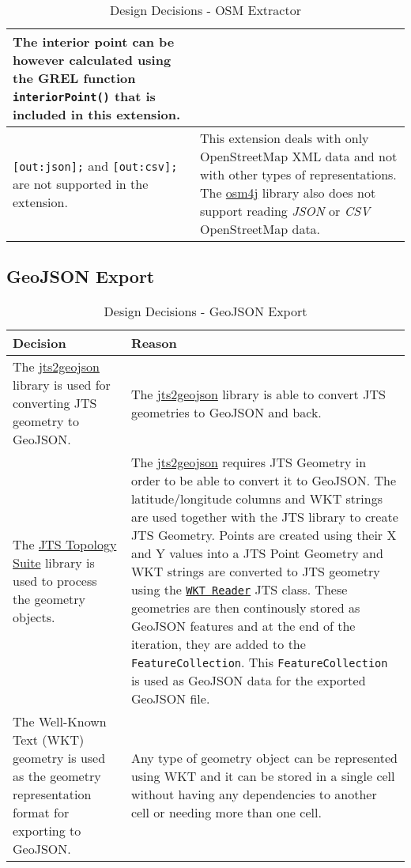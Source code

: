 \begin{table}[htbp]
\begin{tabularx}{\textwidth}{| X | X |}
        The interior point can be however calculated using the GREL function \texttt{interiorPoint()} that is included in this extension.\\ \hline
        \texttt{[out:json];} and \texttt{[out:csv];} are not supported in the extension. & This extension deals with only OpenStreetMap
        XML data and not with other types of representations. The \href{https://github.com/topobyte/osm4j}{osm4j} library also does not support reading
        \textit{JSON} or \textit{CSV} OpenStreetMap data.\\ \hline
    \end{tabularx}
    \caption{Design Decisions - OSM Extractor}
\end{table}
\pagebreak
\subsection{GeoJSON Export}
\begin{table}[htbp]
    \centering
    \begin{tabularx}{\textwidth}{| X | X |} \hline
        \textbf{Decision} & \textbf{Reason}\\[1cm] \hline
        The \href{https://github.com/bjornharrtell/jts2geojson}{jts2geojson} library is used for
        converting JTS geometry to GeoJSON. & The \href{https://github.com/bjornharrtell/jts2geojson}{jts2geojson} library is
        able to convert JTS geometries to GeoJSON and back. \\ \hline
        The \href{https://github.com/locationtech/jts}{JTS Topology Suite} library is used to process the geometry objects. &
        The \href{https://github.com/bjornharrtell/jts2geojson}{jts2geojson} requires JTS Geometry in order to be able to convert it to GeoJSON.
        The latitude/longitude columns and WKT strings are used together with the JTS library to create JTS Geometry.
        Points are created using their X and Y values into a JTS Point Geometry and WKT strings are converted to JTS geometry
        using the \href{https://locationtech.github.io/jts/javadoc/org/locationtech/jts/io/WKTReader.html}{\texttt{WKT Reader}}
        JTS class. These geometries are then continously stored as GeoJSON features and at the end of the iteration,
        they are added to the \texttt{FeatureCollection}.
        This \texttt{FeatureCollection} is used as GeoJSON data for the exported GeoJSON file.\\ \hline
        The Well-Known Text (WKT) geometry is used as the geometry representation format for exporting to GeoJSON. &
        Any type of geometry object can be represented using WKT and it can be stored in a single
        cell without having any dependencies to another cell or needing more than one cell. \\ \hline
    \end{tabularx}
    \caption{Design Decisions - GeoJSON Export}
\end{table}
\pagebreak
